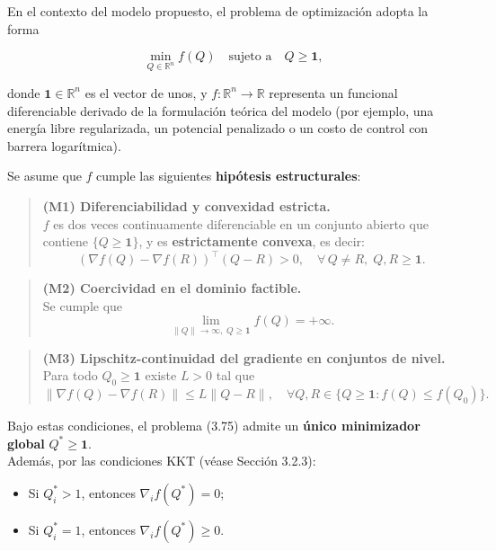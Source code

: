 \documentclass[
  spanish,
  us-letterpaper,
  DIV=11,
  numbers=noendperiod]{scrreprt}
\providecommand{\tightlist}{%
  \setlength{\itemsep}{0pt}\setlength{\parskip}{0pt}}
\numberwithin{equation}{section}
\begin{document}
En el contexto del modelo propuesto, el problema de optimización adopta
la forma

\[
\min_{Q \in \mathbb{R}^n} f(Q)
\quad \text{sujeto a} \quad Q \ge \mathbf{1}, \tag{3.75}
\]

donde \(\mathbf{1} \in \mathbb{R}^n\) es el vector de unos, y
\(f : \mathbb{R}^n \to \mathbb{R}\) representa un funcional
diferenciable derivado de la formulación teórica del modelo (por
ejemplo, una energía libre regularizada, un potencial penalizado o un
costo de control con barrera logarítmica).

Se asume que \(f\) cumple las siguientes \textbf{hipótesis
estructurales}:

\begin{quote}
\textbf{(M1) Diferenciabilidad y convexidad estricta.}\\
\(f\) es dos veces continuamente diferenciable en un conjunto abierto
que contiene \(\{Q \ge \mathbf{1}\}\), y es \textbf{estrictamente
convexa}, es decir: \[
(\nabla f(Q) - \nabla f(R))^\top (Q - R) > 0, \quad \forall\, Q \neq R,\; Q,R \ge \mathbf{1}. \tag{3.76}
\]
\end{quote}

\begin{quote}
\textbf{(M2) Coercividad en el dominio factible.}\\
Se cumple que \[
\lim_{\|Q\| \to \infty,\; Q \ge \mathbf{1}} f(Q) = +\infty. \tag{3.77}
\]
\end{quote}

\begin{quote}
\textbf{(M3) Lipschitz-continuidad del gradiente en conjuntos de
nivel.}\\
Para todo \(Q_0 \ge \mathbf{1}\) existe \(L > 0\) tal que \[
\|\nabla f(Q) - \nabla f(R)\| \le L \|Q - R\|, \quad
\forall Q,R \in \{Q \ge \mathbf{1} : f(Q) \le f(Q_0)\}. \tag{3.78}
\]
\end{quote}

Bajo estas condiciones, el problema (3.75) admite un \textbf{único
minimizador global} \(Q^* \ge \mathbf{1}\).\\
Además, por las condiciones KKT (véase Sección 3.2.3):

\begin{itemize}
\tightlist
\item
  Si \(Q_i^* > 1\), entonces \(\nabla_i f(Q^*) = 0\);\\
\item
  Si \(Q_i^* = 1\), entonces \(\nabla_i f(Q^*) \ge 0\).
\end{itemize}
\end{document}
